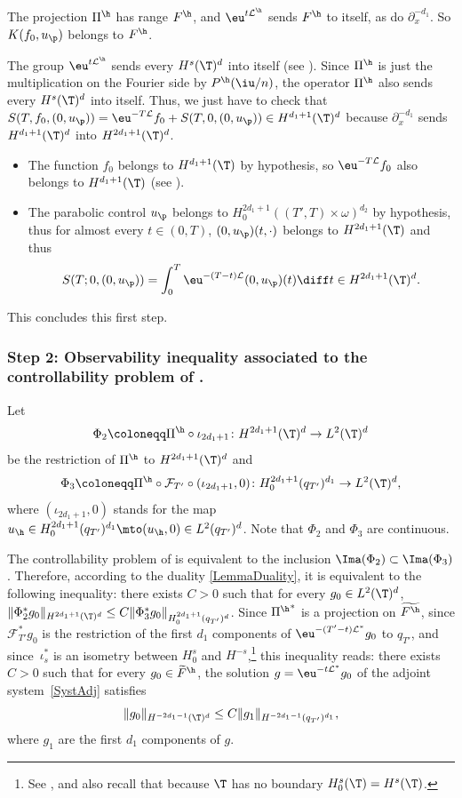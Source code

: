 The projection $\Pi^\h$ has range $F^\h$, and $\eu^{t\mathcal L^\h}$ sends $F^\h$ to itself, as do $\partial_x^{-d_1}$. So $K(f_0,u_\p)$ belongs to $F^\h$.

The group $\eu^{t\mathcal L^\h}$ sends every $H^s(\T)^d$ into itself (see ). Since $\Pi^\h$ is just the multiplication on the Fourier side by $P^\h(\iu/n)$, the operator $\Pi^\h$ also sends every $H^s(\T)^d$ into itself. Thus, we just have to check that $S(T,f_0,(0,u_\p)) = \eu^{-T\mathcal L}f_0+ S(T,0,(0,u_\p))\in H^{d_1+1}(\T)^d$ because $\partial_{x}^{-d_1}$ sends $H^{d_1+1}(\T)^d$ into $H^{2d_1+1}(\T)^d$.
\begin{itemize}
\item The function $f_0$ belongs to $H^{d_1+1}(\T)$ by hypothesis, so $\eu^{-T\mathcal L}f_0$ also belongs to $H^{d_1+1}(\T)$ (see ).
\item The parabolic control $u_{\p}$ belongs to $H^{2d_1+1}_0((T',T)\times\omega)^{d_2}$ by hypothesis, thus for almost every $t \in (0,T)$, $(0,u_{\p})(t,\cdot)$ belongs to $H^{2d_1+1}(\T)$ and thus
\[
S(T;0, (0,u_{\p})) = \int_0^T \eu^{-(T-t)\mathcal{L}} (0,u_{\p})(t) \diff t \in H^{2d_1+1}(\T)^d.
\]
\end{itemize}

This concludes this first step.

\subsubsection*{Step 2: Observability inequality associated to the controllability problem of .}
Let
\[
\Phi_2 \coloneqq \Pi^\h\circ \iota_{2d_1+1} \colon H^{2d_1+1}(\T)^d \to L^2(\T)^d
\]
be the restriction of $\Pi^\h$ to $H^{2d_1+1}(\T)^d$ and
\[
\Phi_3\coloneqq \Pi^\h \circ \mathcal F_{T'}\circ (\iota_{2d_1+1},0)\colon H_0^{2d_1+1}(q_{T'})^{d_1} \to L^2(\T)^d,
\]
where $(\iota_{2d_1+1},0)$ stands for the map $u_\h\in H^{2d_1+1}_0(q_{T'})^{d_1}\mto (u_\h,0) \in L^2(q_{T'})^d$. Note that $\Phi_2$ and $\Phi_3$ are continuous.

The controllability problem of  is equivalent to the inclusion $\Ima(\Phi_2)\subset \Ima(\Phi_3)$. Therefore, according to the duality \cref{LemmaDuality}, it is equivalent to the following inequality: there exists $C>0$ such that for every $g_0\in L^2(\T)^d$, $\|\Phi_2^* g_0\|_{H^{2d_1+1}(\T)^d} \leq C\|\Phi_3^* g_0\|_{H^{2d_1+1}_0(q_{T'})^d}$.
Since ${\Pi^\h}^*$ is a projection on $\widetilde{F^\h}$, since $\mathcal F_{T'}^*g_0$ is the restriction of the first $d_1$ components of $\eu^{-(T'-t)\mathcal L^*}g_0$ to $q_{T'}$, and since~$\iota_s^*$ is an isometry between $H^s_0$ and $H^{-s}$,\footnote{See , and also recall that because $\T$ has no boundary $H^s_0(\T) = H^s(\T)$.} this inequality reads: there exists~$C>0$ such that for every $g_0\in \widetilde F^\h$, the solution $g = \eu^{-t\mathcal L^*}g_0$ of the adjoint system~\eqref{SystAdj} satisfies
\begin{equation}
\label{obs_lem_hyp_par}
\|g_0\|_{H^{-2d_1-1}(\T)^d} \leq C \|g_1\|_{H^{-2d_1-1}(q_{T'})^{d_1}},
\end{equation}
where $g_1$ are the first $d_1$ components of $g$.

